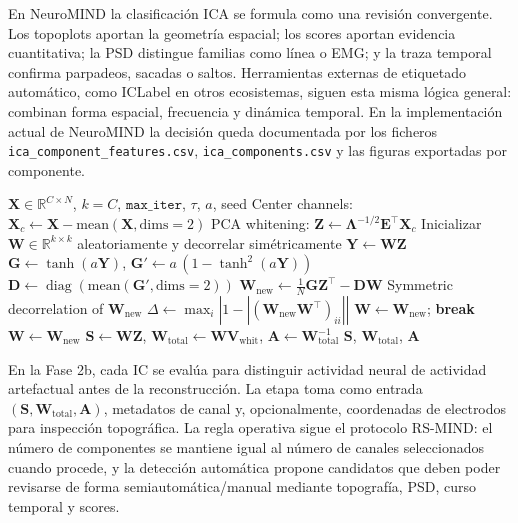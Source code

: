 \begin{decisionmetodologica}
\small
En NeuroMIND la clasificación ICA se formula como una revisión convergente. Los topoplots aportan la geometría espacial; los scores aportan evidencia cuantitativa; la PSD distingue familias como línea o EMG; y la traza temporal confirma parpadeos, sacadas o saltos. Herramientas externas de etiquetado automático, como ICLabel en otros ecosistemas, siguen esta misma lógica general: combinan forma espacial, frecuencia y dinámica temporal. En la implementación actual de NeuroMIND la decisión queda documentada por los ficheros \texttt{ica\_component\_features.csv}, \texttt{ica\_components.csv} y las figuras exportadas por componente.
\end{decisionmetodologica}

\begin{algorithm}[H]
\caption{Pseudocódigo operativo de FastICA simétrico (Fase 2a)}
\begin{algorithmic}
\Require $\mathbf{X}\in\mathbb{R}^{C\times N}$, $k=C$, $\texttt{max\_iter}$, $\tau$, $a$, seed
\State Center channels: $\mathbf{X}_c \gets \mathbf{X}-\mathrm{mean}(\mathbf{X},\text{dims}=2)$
\State PCA whitening: $\mathbf{Z}\gets \mathbf{\Lambda}^{-1/2}\mathbf{E}^{\top}\mathbf{X}_c$
  \State Inicializar $\mathbf{W}\in\mathbb{R}^{k\times k}$ aleatoriamente y decorrelar simétricamente
  \State $\mathbf{Y}\gets \mathbf{W}\mathbf{Z}$
  \State $\mathbf{G}\gets \tanh(a\mathbf{Y})$, $\mathbf{G}'\gets a\,(1-\tanh^2(a\mathbf{Y}))$
  \State $\mathbf{D}\gets \operatorname{diag}(\mathrm{mean}(\mathbf{G}',\text{dims}=2))$
  \State $\mathbf{W}_{\text{new}}\gets \frac{1}{N}\mathbf{G}\mathbf{Z}^{\top}-\mathbf{D}\mathbf{W}$
  \State Symmetric decorrelation of $\mathbf{W}_{\text{new}}$
  \State $\Delta\gets \max_i\left|1-\left|\left(\mathbf{W}_{\text{new}}\mathbf{W}^{\top}\right)_{ii}\right|\right|$
  \If{$\Delta<\tau$}
    \State $\mathbf{W}\gets \mathbf{W}_{\text{new}}$; \textbf{break}
  \EndIf
  \State $\mathbf{W}\gets \mathbf{W}_{\text{new}}$
\EndFor
\State $\mathbf{S}\gets \mathbf{W}\mathbf{Z}$, $\mathbf{W}_{\text{total}}\gets \mathbf{W}\mathbf{V}_{\text{whit}}$, $\mathbf{A}\gets \mathbf{W}_{\text{total}}^{-1}$
\Ensure $\mathbf{S}$, $\mathbf{W}_{\text{total}}$, $\mathbf{A}$
\end{algorithmic}
\end{algorithm}

En la Fase 2b, cada IC se evalúa para distinguir actividad neural de actividad artefactual antes de la reconstrucción. La etapa toma como entrada $(\mathbf{S},\mathbf{W}_{\text{total}},\mathbf{A})$, metadatos de canal y, opcionalmente, coordenadas de electrodos para inspección topográfica. La regla operativa sigue el protocolo RS-MIND: el número de componentes se mantiene igual al número de canales seleccionados cuando procede, y la detección automática propone candidatos que deben poder revisarse de forma semiautomática/manual mediante topografía, PSD, curso temporal y scores.

